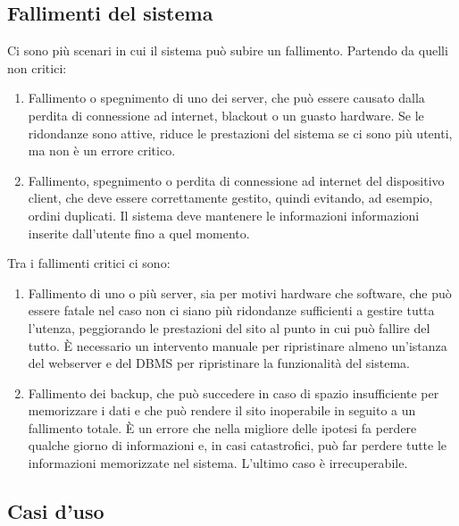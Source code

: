 \documentclass[12pt,a4paper]{article}
\begin{document}
\subsection{Fallimenti del sistema}
Ci sono più scenari in cui il sistema può subire un fallimento. Partendo da quelli non critici:
\begin{enumerate}
\item Fallimento o spegnimento di uno dei server, che può essere causato dalla perdita di connessione ad internet, blackout o un guasto hardware. Se le ridondanze sono attive, riduce le prestazioni del sistema se ci sono più utenti, ma non è un errore critico.
\item Fallimento, spegnimento o perdita di connessione ad internet del dispositivo client, che deve essere correttamente gestito, quindi evitando, ad esempio, ordini duplicati. Il sistema deve mantenere le informazioni informazioni inserite dall'utente fino a quel momento.
\end{enumerate}

Tra i fallimenti critici ci sono:

\begin{enumerate}
\item Fallimento di uno o più server, sia per motivi hardware che software, che può essere fatale nel caso non ci siano più ridondanze sufficienti a gestire tutta l'utenza, peggiorando le prestazioni del sito al punto in cui può fallire del tutto. È necessario un intervento manuale per ripristinare almeno un'istanza del webserver e del DBMS per ripristinare la funzionalità del sistema.
\item Fallimento dei backup, che può succedere in caso di spazio insufficiente per memorizzare i dati e che può rendere il sito inoperabile in seguito a un fallimento totale. È un errore che nella migliore delle ipotesi fa perdere qualche giorno di informazioni e, in casi catastrofici, può far perdere tutte le informazioni memorizzate nel sistema. L'ultimo caso è irrecuperabile.
\end{enumerate}


\subsection{Casi d'uso}
\end{document}
